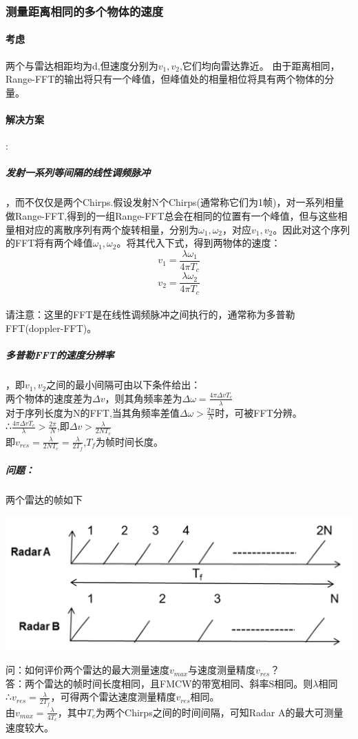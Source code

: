 \documentclass[UTF8]{ctexart}
\begin{document}
\subsubsection{测量距离相同的多个物体的速度}
\paragraph{考虑}两个与雷达相距均为d,但速度分别为$v_1,v_2$,它们均向雷达靠近。
由于距离相同，Range-FFT的输出将只有一个峰值，但峰值处的相量相位将具有两个物体的分量。
\paragraph{解决方案}:
\subparagraph{发射一系列等间隔的线性调频脉冲}，而不仅仅是两个Chirps.假设发射N个Chirps(通常称它们为1帧)，对一系列相量做Range-FFT,得到的一组Range-FFT总会在相同的位置有一个峰值，但与这些相量相对应的离散序列有两个旋转相量，分别为$\omega_1,\omega_2$，对应$v_1,v_2$。因此对这个序列的FFT将有两个峰值$\omega_1,\omega_2$。将其代入下式，得到两物体的速度：\\
\[v_1=\frac{\lambda \omega_1}{4 \pi T_c}\]
\[v_2=\frac{\lambda \omega_2}{4 \pi T_c}\]\\
请注意：这里的FFT是在线性调频脉冲之间执行的，通常称为多普勒FFT(doppler-FFT)。
\subparagraph{多普勒FFT的速度分辨率}，即$v_1,v_2$之间的最小间隔可由以下条件给出：\\
两个物体的速度差为$\Delta v$，则其角频率差为\(\Delta \omega=\frac{4\pi \Delta v T_c}{\lambda}\)\\
对于序列长度为N的FFT,当其角频率差值$\Delta \omega>\frac{2\pi}{N}$时，可被FFT分辨。\\
∴$\frac{4\pi \Delta v T_c}{\lambda}>\frac{2\pi}{N}$,即$\Delta v > \frac{\lambda}{2NT_c}$\\
即$v_{res}=\frac{\lambda}{2NT_c}=\frac{\lambda}{2T_f}$,$T_f$为帧时间长度。\\
\subparagraph{问题：}两个雷达的帧如下

{\centering \includegraphics[width = .4\textwidth]{pic/diffframe.png}

}
问：如何评价两个雷达的最大测量速度$v_{max}$与速度测量精度$v_{res}$？\\
答：两个雷达的帧时间长度相同，且FMCW的带宽相同、斜率S相同。则$\lambda$相同\\
∴$v_{res}=\frac{\lambda}{2T_f}$，可得两个雷达速度测量精度$v_{res}$相同。\\
由$v_{max}=\frac{\lambda}{4T_c}$，其中$T_c$为两个Chirps之间的时间间隔，可知Radar A的最大可测量速度较大。\\
\end{document}
